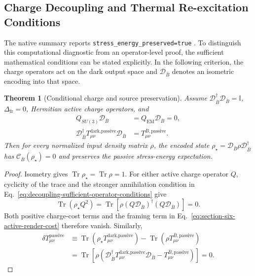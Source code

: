 \documentclass[11pt,letterpaper]{article}
\theoremstyle{plain}
\newtheorem{theorem}{Theorem}
\DeclareMathOperator{\Tr}{Tr}
\DeclareRobustCommand{\pyvar}[1]{%
  \ifmmode\text{\nolinkurl{#1}}\else\nolinkurl{#1}\fi%
}
\newcommand{\Deltafr}{\Delta_{\text{fr}}}
\begin{document}
\subsection{Charge Decoupling and Thermal Re-excitation Conditions}
\label{sec:conditional-thermal-decoupling}

The native summary reports \pyvar{stress_energy_preserved=true}.
To distinguish this computational diagnostic from an operator-level proof,
the sufficient mathematical conditions can be stated explicitly.  In the
following criterion, the charge operators act on the dark output space and
\(\mathcal D_{\bar B}\) denotes an isometric encoding into that space.

\begin{theorem}[Conditional charge and source preservation]
Assume \(\mathcal D_{\bar B}^{\dagger}\mathcal D_{\bar B}=\mathbb I\),
\(\Deltafr=0\), Hermitian active charge operators, and
\begin{equation}
\label{eq:decoupling-sufficient-operator-conditions}
 \begin{aligned}
 Q_{SU(3)}\mathcal D_{\bar B}
 &=Q_{\text{EM}}\mathcal D_{\bar B}=0,\\
 \mathcal D_{\bar B}^{\dagger}
 T_{\mu\nu}^{\text{dark},\text{passive}}
 \mathcal D_{\bar B}
 &=T_{\mu\nu}^{\bar B,\text{passive}}.
 \end{aligned}
\end{equation}
Then for every normalized input density matrix \(\rho\), the encoded
state \(\rho_\star=\mathcal D_{\bar B}\rho\mathcal D_{\bar B}^{\dagger}\)
has \(\mathcal C_{\bar B}(\rho_\star)=0\) and preserves the passive
stress-energy expectation.
\end{theorem}

\begin{proof}
Isometry gives \(\Tr\rho_\star=\Tr\rho=1\).  For either active charge
operator \(Q\), cyclicity of the trace and the stronger annihilation
condition in Eq.~\eqref{eq:decoupling-sufficient-operator-conditions} give
\begin{equation}
\label{eq:decoupling-quadratic-cost-proof}
 \Tr(\rho_\star Q^2)
 =\Tr\!\left[\rho( Q\mathcal D_{\bar B})^{\dagger}
                         ( Q\mathcal D_{\bar B})\right]=0.
\end{equation}
Both positive charge-cost terms and the framing term in
Eq.~\eqref{eq:section-six-active-render-cost} therefore vanish.  Similarly,
\begin{equation}
\label{eq:decoupling-passive-source-proof}
 \begin{aligned}
 \delta T_{\mu\nu}^{\text{passive}}
 &\equiv\Tr\!\left(\rho_\star
            T_{\mu\nu}^{\text{dark},\text{passive}}\right)
       -\Tr\!\left(\rho T_{\mu\nu}^{\bar B,\text{passive}}\right)\\
 &=\Tr\!\left[\rho\left(
 \mathcal D_{\bar B}^{\dagger}T_{\mu\nu}^{\text{dark},\text{passive}}
 \mathcal D_{\bar B}-T_{\mu\nu}^{\bar B,\text{passive}}
 \right)\right]=0.
 \end{aligned}
\end{equation}
\end{proof}
\end{document}
